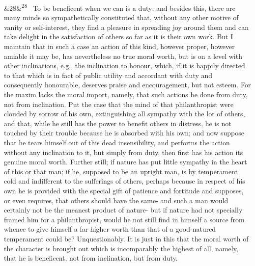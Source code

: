 \documentclass[12pt]{article}
\newcommand{\para}[1][]{\par\noindent\ifx&#1&\else\textsuperscript{\footnotesize #1}~\fi}
\begin{document}
\para[28] To be beneficent when we can is a duty; and besides this, there are many minds so sympathetically constituted that, without any other motive of vanity or self-interest, they find a pleasure in spreading joy around them and can take delight in the satisfaction of others so far as it is their own work. But I maintain that in such a case an action of this kind, however proper, however amiable it may be, has nevertheless no true moral worth, but is on a level with other inclinations, e.g., the inclination to honour, which, if it is happily directed to that which is in fact of public utility and accordant with duty and consequently honourable, deserves praise and encouragement, but not esteem. For the maxim lacks the moral import, namely, that such actions be done from duty, not from inclination. Put the case that the mind of that philanthropist were clouded by sorrow of his own, extinguishing all sympathy with the lot of others, and that, while he still has the power to benefit others in distress, he is not touched by their trouble because he is absorbed with his own; and now suppose that he tears himself out of this dead insensibility, and performs the action without any inclination to it, but simply from duty, then first has his action its genuine moral worth. Further still; if nature has put little sympathy in the heart of this or that man; if he, supposed to be an upright man, is by temperament cold and indifferent to the sufferings of others, perhaps because in respect of his own he is provided with the special gift of patience and fortitude and supposes, or even requires, that others should have the same- and such a man would certainly not be the meanest product of nature- but if nature had not specially framed him for a philanthropist, would he not still find in himself a source from whence to give himself a far higher worth than that of a good-natured temperament could be? Unquestionably. It is just in this that the moral worth of the character is brought out which is incomparably the highest of all, namely, that he is beneficent, not from inclination, but from duty.
\end{document}
